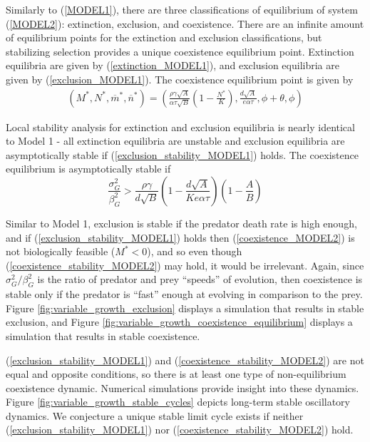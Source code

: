 \documentclass{amsart}
\theoremstyle{definition}
\theoremstyle{remark}
\numberwithin{equation}{section}
\begin{document}
Similarly to (\ref{MODEL1}), there are three classifications of equilibrium of system (\ref{MODEL2}): extinction, exclusion, and coexistence.  There are an infinite amount of equilibrium points for the extinction and exclusion classifications, but stabilizing selection provides a unique coexistence equilibrium point.  Extinction equilibria are given by (\ref{extinction_MODEL1}), and exclusion equilibria are given by (\ref{exclusion_MODEL1}).  The coexistence equilibrium point is given by
\begin{equation}
	\label{coexistence_MODEL2}
	\begin{aligned}
		(M^*, N^*, \overline{m}^*, \overline{n}^*) = \left(\frac{\rho\gamma\sqrt{A}}{\alpha\tau\sqrt{B}}\left(1 - \frac{N^*}{K}\right), \frac{d\sqrt{A}}{e\alpha\tau}, \phi + \theta, \phi\right)
	\end{aligned}
\end{equation}

Local stability analysis for extinction and exclusion equilibria is nearly identical to Model 1 - all extinction equilibria are unstable and exclusion equilibria are asymptotically stable if (\ref{exclusion_stability_MODEL1}) holds.  The coexistence equilibrium is asymptotically stable if
\begin{equation}
	\label{coexistence_stability_MODEL2}
	\frac{\sigma_G^2}{\beta_G^2} > \frac{\rho\gamma}{d\sqrt{B}}\left(1 - \frac{d\sqrt{A}}{Ke\alpha\tau}\right)\left(1 - \frac{A}{B}\right)
\end{equation}

Similar to Model 1, exclusion is stable if the predator death rate is high enough, and if (\ref{exclusion_stability_MODEL1}) holds then (\ref{coexistence_MODEL2}) is not biologically feasible ($M^* < 0$), and so even though (\ref{coexistence_stability_MODEL2}) may hold, it would be irrelevant.  Again, since $\sigma_G^2/\beta_G^2$ is the ratio of predator and prey ``speeds'' of evolution, then coexistence is stable only if the predator is ``fast'' enough at evolving in comparison to the prey.  Figure \ref{fig:variable_growth_exclusion} displays a simulation that results in stable exclusion, and Figure \ref{fig:variable_growth_coexistence_equilibrium} displays a simulation that results in stable coexistence.

(\ref{exclusion_stability_MODEL1}) and (\ref{coexistence_stability_MODEL2}) are not equal and opposite conditions, so there is at least one type of non-equilibrium coexistence dynamic.  Numerical simulations provide insight into these dynamics.  Figure \ref{fig:variable_growth_stable_cycles} depicts long-term stable oscillatory dynamics.  We conjecture a unique stable limit cycle exists if neither (\ref{exclusion_stability_MODEL1}) nor (\ref{coexistence_stability_MODEL2}) hold.
\end{document}
